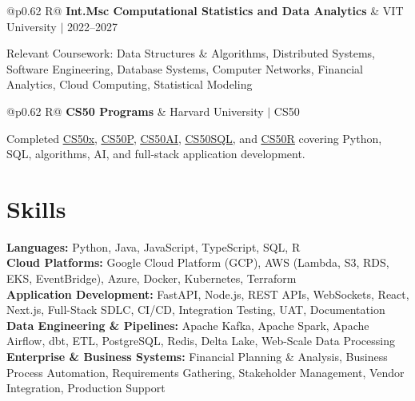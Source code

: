 \documentclass[a4paper,10pt]{article}
\newcommand{\ulink}[2]{\href{#1}{\uline{#2}}}
\newcommand{\subheading}[1]{{\color[HTML]{0A0A0A}\fontsize{12}{14}\selectfont\bfseries #1}}
\newcommand{\meta}[1]{{\color[HTML]{5C5C5C}\fontsize{10.5}{12.5}\selectfont #1}}
\begin{document}
\begin{tabularx}{\linewidth}{@{}p{0.62\linewidth} R@{}}
  \subheading{Int.Msc Computational Statistics and Data Analytics} &
  \meta{VIT University $|$ 2022--2027}
\end{tabularx}
\vspace{2pt}
{\color[HTML]{3A3A3A}\fontsize{11}{14}\selectfont Relevant Coursework: Data Structures \& Algorithms, Distributed Systems, Software Engineering, Database Systems, Computer Networks, Financial Analytics, Cloud Computing, Statistical Modeling}

\begin{tabularx}{\linewidth}{@{}p{0.62\linewidth} R@{}}
  \subheading{CS50 Programs} &
  \meta{Harvard University $|$ CS50}
\end{tabularx}
\vspace{2pt}
{\color[HTML]{3A3A3A}\fontsize{11}{14}\selectfont Completed \ulink{https://cs50.harvard.edu/certificates/b14b78df-e05c-413e-a607-1dd27303053a}{CS50x}, \ulink{https://cs50.harvard.edu/certificates/32477052-9db4-49c4-a5a4-d7e58429ca2c}{CS50P}, \ulink{https://cs50.harvard.edu/certificates/9cdb4d4a-1250-4f8e-9fd7-191864e0f919}{CS50AI}, \ulink{https://cs50.harvard.edu/certificates/bc486f24-f085-4e61-8536-80940b97a1b9}{CS50SQL}, and \ulink{https://cs50.harvard.edu/certificates/666838e6-a053-4d82-b179-a60fe745fd84}{CS50R} covering Python, SQL, algorithms, AI, and full-stack application development.}

\section{Skills}
\vspace{2pt}
{\color[HTML]{0A0A0A}\fontsize{11}{14}\selectfont
\textbf{Languages:} Python, Java, JavaScript, TypeScript, SQL, R \\[2pt]
\textbf{Cloud Platforms:} Google Cloud Platform (GCP), AWS (Lambda, S3, RDS, EKS, EventBridge), Azure, Docker, Kubernetes, Terraform \\[2pt]
\textbf{Application Development:} FastAPI, Node.js, REST APIs, WebSockets, React, Next.js, Full-Stack SDLC, CI/CD, Integration Testing, UAT, Documentation \\[2pt]
\textbf{Data Engineering \& Pipelines:} Apache Kafka, Apache Spark, Apache Airflow, dbt, ETL, PostgreSQL, Redis, Delta Lake, Web-Scale Data Processing \\[2pt]
\textbf{Enterprise \& Business Systems:} Financial Planning \& Analysis, Business Process Automation, Requirements Gathering, Stakeholder Management, Vendor Integration, Production Support
}
\end{document}
